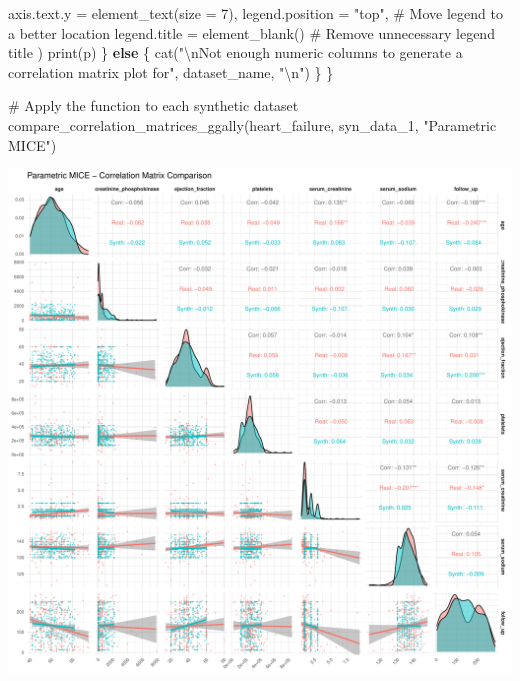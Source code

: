 \documentclass[
  letterpaper,
  DIV=11,
  numbers=noendperiod]{scrartcl}
\newenvironment{Shaded}{\begin{snugshade}}{\end{snugshade}}
\newcommand{\AttributeTok}[1]{\textcolor[rgb]{0.40,0.45,0.13}{#1}}
\newcommand{\CommentTok}[1]{\textcolor[rgb]{0.37,0.37,0.37}{#1}}
\newcommand{\ControlFlowTok}[1]{\textcolor[rgb]{0.00,0.23,0.31}{\textbf{#1}}}
\newcommand{\DecValTok}[1]{\textcolor[rgb]{0.68,0.00,0.00}{#1}}
\newcommand{\FunctionTok}[1]{\textcolor[rgb]{0.28,0.35,0.67}{#1}}
\newcommand{\NormalTok}[1]{\textcolor[rgb]{0.00,0.23,0.31}{#1}}
\newcommand{\SpecialCharTok}[1]{\textcolor[rgb]{0.37,0.37,0.37}{#1}}
\newcommand{\StringTok}[1]{\textcolor[rgb]{0.13,0.47,0.30}{#1}}
\begin{document}
\begin{Shaded}
\begin{Highlighting}[]
        \AttributeTok{axis.text.y =} \FunctionTok{element\_text}\NormalTok{(}\AttributeTok{size =} \DecValTok{7}\NormalTok{),}
        \AttributeTok{legend.position =} \StringTok{"top"}\NormalTok{,  }\CommentTok{\# Move legend to a better location}
        \AttributeTok{legend.title =} \FunctionTok{element\_blank}\NormalTok{()  }\CommentTok{\# Remove unnecessary legend title}
\NormalTok{      )}
    \FunctionTok{print}\NormalTok{(p)}
\NormalTok{  \} }\ControlFlowTok{else}\NormalTok{ \{}
    \FunctionTok{cat}\NormalTok{(}\StringTok{"}\SpecialCharTok{\textbackslash{}n}\StringTok{Not enough numeric columns to generate a correlation matrix plot for"}\NormalTok{, dataset\_name, }\StringTok{"}\SpecialCharTok{\textbackslash{}n}\StringTok{"}\NormalTok{)}
\NormalTok{  \}}
\NormalTok{\}}

\CommentTok{\# Apply the function to each synthetic dataset}
\FunctionTok{compare\_correlation\_matrices\_ggally}\NormalTok{(heart\_failure, syn\_data\_1, }\StringTok{"Parametric MICE"}\NormalTok{)}
\end{Highlighting}
\end{Shaded}

\begin{center}
\includegraphics[width=1\linewidth,height=\textheight,keepaspectratio]{heart_failure_synthetic_data_project_files/figure-pdf/Correlation Matrices Comparison using GGally-1.pdf}
\end{center}
\end{document}
